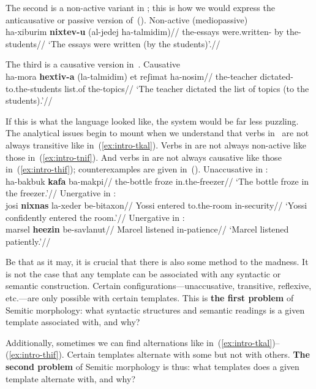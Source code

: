 The second is a non-active variant in {\tnif}; this is how we would express the anticausative or passive version of~(\lastx).
\ex \label{ex:intro-tnif}Non-active (mediopassive) {\tnif}\\
		\begingl
		\gla ha-xiburim \textbf{nixtev-u} (al-jedej ha-talmidim)//
		\glb the-essays were.written- by the-students//
		\glft `The essays were written (by the students)'.//
	\endgl
\xe

The third is a causative version in~{\thif}.
\ex \label{ex:intro-thif}Causative {\thif}\\
		\begingl
		\gla ha-mora \textbf{hextiv-a} (la-talmidim) et reʃimat ha-nosim//
		\glb the-teacher dictated- to.the-students  list.of the-topics//
		\glft `The teacher dictated the list of topics (to the students).'//
	\endgl
\xe

If this is what the language looked like, the system would be far less puzzling. The analytical issues begin to mount when we understand that verbs in~{\tkal} are not always transitive like in~(\ref{ex:intro-tkal}). Verbs in {\tnif} are not always non-active like those in~(\ref{ex:intro-tnif}). And verbs in {\thif} are not always causative like those in~(\ref{ex:intro-thif}); counterexamples are given in~(\nextx).
\pex
	\a Unaccusative in {\tkal}:\\
		\begingl
		\gla ha-bakbuk \textbf{kafa} ba-makpi//
		\glb the-bottle froze in.the-freezer//
		\glft `The bottle froze in the freezer.'//
	\endgl	
	\a Unergative in {\tnif}:\\
		\begingl
		\gla josi \textbf{nixnas} la-xeder be-bitaxon//
		\glb Yossi entered to.the-room in-security//
		\glft `Yossi confidently entered the room.'//
	\endgl
	\a Unergative in {\thif}:\\
		\begingl
		\gla marsel \textbf{heezin} be-savlanut//
		\glb Marcel listened in-patience//
		\glft `Marcel listened patiently.'//
	\endgl
\xe

Be that as it may, it is crucial that there is also some method to the madness. It is not the case that any template can be associated with any syntactic or semantic construction. Certain configurations---unaccusative, transitive, reflexive, etc.---are only possible with certain templates. This is \textbf{the first problem} of Semitic morphology: what syntactic structures and semantic readings is a given template associated with, and why?

Additionally, sometimes we can find alternations like in~(\ref{ex:intro-tkal})--(\ref{ex:intro-thif}). Certain templates alternate with some but not with others. \textbf{The second problem} of Semitic morphology is thus: what templates does a given template alternate with, and why?

